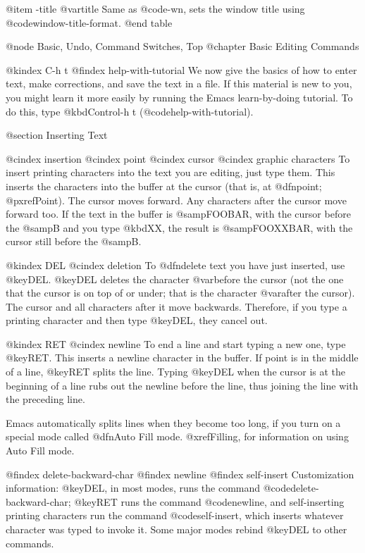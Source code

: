 {{@item -title @var{title}
Same as @code{-wn}, sets the window title using @code{window-title-format}.
@end table

@node Basic, Undo, Command Switches, Top
@chapter Basic Editing Commands

@kindex C-h t
@findex help-with-tutorial
  We now give the basics of how to enter text, make corrections, and
save the text in a file.  If this material is new to you, you might
learn it more easily by running the Emacs learn-by-doing tutorial.  To
do this, type @kbd{Control-h t} (@code{help-with-tutorial}).

@section Inserting Text

@cindex insertion
@cindex point
@cindex cursor
@cindex graphic characters
  To insert printing characters into the text you are editing, just type
them.  This inserts the characters into the buffer at the cursor (that
is, at @dfn{point}; @pxref{Point}).  The cursor moves forward.  Any
characters after the cursor move forward too.  If the text in the buffer
is @samp{FOOBAR}, with the cursor before the @samp{B} and you type
@kbd{XX}, the result is @samp{FOOXXBAR}, with the cursor still before the
@samp{B}.

@kindex DEL
@cindex deletion
   To @dfn{delete} text you have just inserted, use @key{DEL}.
@key{DEL} deletes the character @var{before} the cursor (not the one
that the cursor is on top of or under; that is the character @var{after}
the cursor).  The cursor and all characters after it move backwards.
Therefore, if you type a printing character and then type @key{DEL},
they cancel out.

@kindex RET
@cindex newline
   To end a line and start typing a new one, type @key{RET}.  This
inserts a newline character in the buffer.  If point is in the middle of
a line, @key{RET} splits the line.  Typing @key{DEL} when the cursor is
at the beginning of a line rubs out the newline before the line, thus
joining the line with the preceding line.

  Emacs automatically splits lines when they become too long, if you
turn on a special mode called @dfn{Auto Fill} mode.  @xref{Filling}, for
information on using Auto Fill mode.

@findex delete-backward-char
@findex newline
@findex self-insert
  Customization information: @key{DEL}, in most modes, runs the command
@code{delete-backward-char}; @key{RET} runs the command @code{newline},
and self-inserting printing characters run the command
@code{self-insert}, which inserts whatever character was typed to invoke
it.  Some major modes rebind @key{DEL} to other commands.

}}

